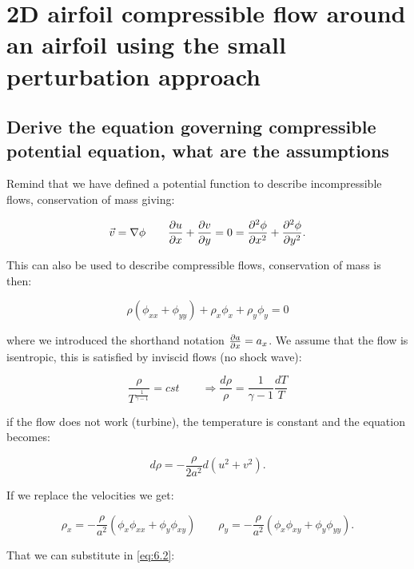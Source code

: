 \documentclass[british,french,11pt, a4paper, openany]{article}
\begin{document}
\section{2D airfoil compressible flow around an airfoil using the small perturbation
	approach}

\subsection{Derive the equation governing compressible potential equation, what are the
	assumptions}

Remind that we have defined a potential function to describe incompressible flows, conservation of mass giving:

\begin{equation}
\vec{v} = \nabla \phi \qquad \frac{\D u}{\D x} + \frac{\D v}{\D y} = 0 = \frac{\D^2 \phi}{\D x^2} + \frac{\D^2 \phi}{\D y^2}.
\end{equation}

This can also be used to describe compressible flows, conservation of mass is then: 

\begin{equation}
\rho (\phi _{xx} + \phi _{yy}) + \rho _x \phi _x + \rho _y \phi _y = 0
\label{eq:6.2}
\end{equation}

where we introduced the shorthand notation $\frac{\D a}{\D x} = a_x$. We assume that the flow is isentropic, this is satisfied by inviscid flows (no shock  wave): 

\begin{equation}
\frac{\rho}{T^{\frac{1}{\gamma -1}}} = cst \qquad \Rightarrow \frac{d \rho}{\rho} = \frac{1}{\gamma -1} \frac{dT}{T}
\end{equation}

if the flow does not work (turbine), the temperature is constant and the equation becomes:

\begin{equation}
d\rho = -\frac{\rho}{2a^2} d(u^2+v^2).
\end{equation}

If we replace the velocities we get: 

\begin{equation}
\rho _x = -\frac{\rho}{a^2} (\phi _x \phi _{xx} + \phi _y \phi _{xy}) \qquad \rho _y = -\frac{\rho}{a^2} (\phi _x \phi _{xy} + \phi _y \phi _{yy}).
\end{equation}		

That we can substitute in \eqref{eq:6.2}:
\end{document}
